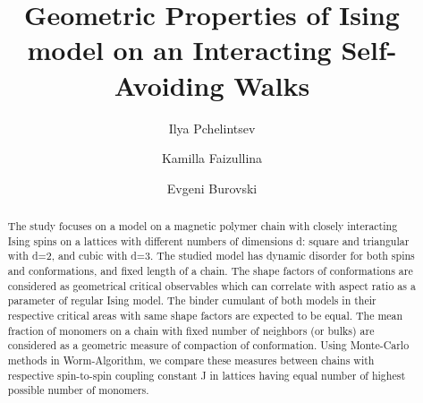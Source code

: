 \documentclass[a4paper]{jpconf}
\begin{document}
\title{Geometric Properties of Ising model on an Interacting Self-Avoiding Walks}

\author{Ilya Pchelintsev}
\author{Kamilla Faizullina}
\author{Evgeni Burovski}


\address{National Research University Higher School of Economics, 101000 Moscow, Russia}


\begin{abstract}
The study focuses on a model on a magnetic polymer chain with closely interacting Ising spins on a lattices with different numbers of dimensions d: square and triangular with d=2, and cubic with d=3. The studied model has dynamic disorder for both spins and conformations, and fixed length of a chain. The shape factors of conformations are considered as geometrical critical observables which can correlate with aspect ratio as a parameter of regular Ising model. The binder cumulant of both models in their respective critical areas with same shape factors are expected to be equal. The mean fraction of monomers on a chain with fixed number of neighbors (or bulks) are considered as a geometric measure of compaction of conformation. Using Monte-Carlo methods in Worm-Algorithm, we compare these measures between chains with respective spin-to-spin coupling constant J in lattices having equal number of highest possible number of monomers. 
\end{abstract}










\end{document}
